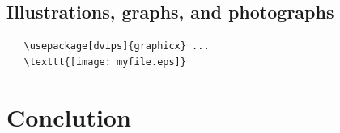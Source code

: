 \documentclass[final]{cvpr}
\begin{document}





\subsection{Illustrations, graphs, and photographs}





{\small\begin{verbatim}
   \usepackage[dvips]{graphicx} ...
   \texttt{[image: myfile.eps]}
\end{verbatim}
}

\section{Conclution}

{\small


}
\end{document}
